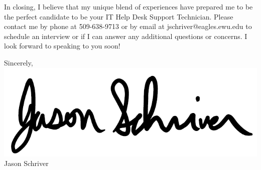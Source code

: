 \documentclass[a4paper,10pt]{article}
\begin{document}
\par
In closing, I believe that my unique blend of experiences have prepared me to be the perfect candidate to be your IT Help Desk Support Technician. Please contact me by phone at 509-638-9713 or by email at jschriver@eagles.ewu.edu to schedule an interview or if I can answer any additional questions or concerns. I look forward to speaking to you soon!
\par
Sincerely,\\
\includegraphics[scale=.25]{signature}\\
Jason Schriver

\end{document}
